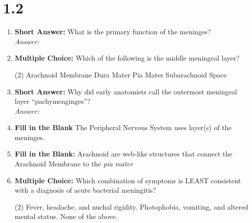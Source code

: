 \section*{1.2}
\begin{enumerate}[label=\textbf{Q1.2.\arabic*}]
      \item \textbf{Short Answer:} What is the primary function of the meninges? \\
            \textit{Answer:} \\%

      \item \textbf{Multiple Choice:} Which of the following is the middle meningeal layer?
            \begin{tasks}[label=\textcolor{\documentTheme}{(\Alph*)}, item-format=\color{\documentTheme}, label-width=1.5em, item-indent=1.7em](2) %
                  \task Arachnoid Membrane
                  \task Dura Mater
                  \task Pia Mater
                  \task Subarachnoid Space
            \end{tasks}

      \item \textbf{Short Answer:} Why did early anatomists call the outermost meningeal layer ``pachymenginges''? \\
            \textit{Answer:} \\%

      \item \textbf{Fill in the Blank} The Peripheral Nervous System uses \underline{\hspace{3cm}} layer(s) of the meninges. \\

      \item \textbf{Fill in the Blank:} Arachnoid \underline{\hspace{3cm}} are web-like structures that connect the Arachnoid Membrane to the \textit{pia mater}

      \item \textbf{Multiple Choice:} Which combination of symptoms is LEAST consistent with a diagnosis of acute bacterial meningitis?
            \begin{tasks}[label=\textcolor{\documentTheme}{(\Alph*)}, item-format=\color{\documentTheme}, label-width=1.5em, item-indent=1.7em](2)
                  \task Fever, headache, and nuchal rigidity.
                  \task Photophobia, vomiting, and altered mental status.
                  \task None of the above.
            \end{tasks}


\end{enumerate}
